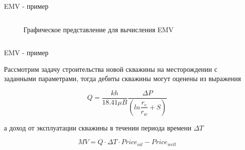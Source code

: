 \begin{frame}{EMV - пример}
\begin{columns}
\begin{column}{0.5\textwidth}
\begin{center}
\begin{figure}[h!]
                	\label{ris:chance_node}
                	\caption{Графическое представление для вычисления EMV}
                \end{figure}
             
             \end{center}
        \end{column}
    \end{columns}


\end{frame}

\begin{frame}{EMV - пример}

Рассмотрим задачу строительства новой скважины на месторождении с заданными параметрами, тогда дебиты скважины могут оценены из выражения


\begin{equation}
	Q = \frac{kh}{18.41 \mu B} \frac{\Delta P}{  \left( ln\dfrac{r_e}{r_w} + S\right) }
	\label{eq:eq_q}
\end{equation}


а доход от эксплуатации скважины в течении периода времени  $\Delta T$

\begin{equation}
	MV = Q \cdot  \Delta T \cdot  Price_{oil} - Price_{well}
	\label{eq:eq_MV}
\end{equation}

\end{frame}

